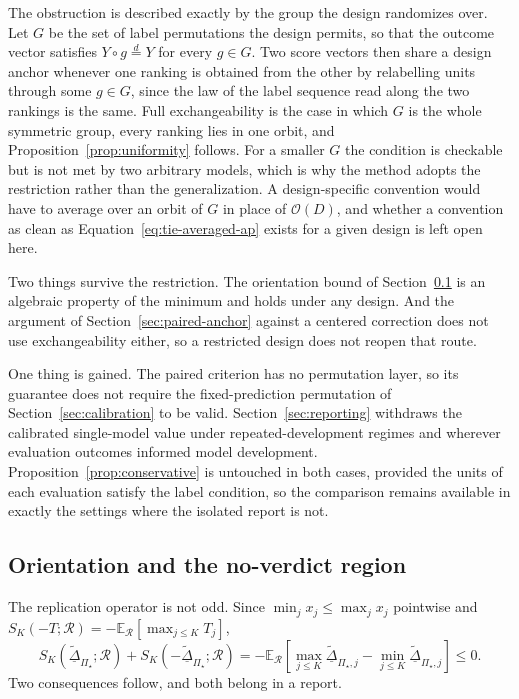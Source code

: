 \documentclass[11pt]{article}
\newcommand{\Regime}{\mathcal{R}}
\newcommand{\PSet}{\Pi_\star}
\newcommand{\E}{\mathbb{E}}
\newcommand{\RobDta}{\underline{\widetilde{\Delta}}_{\PSet}}
\theoremstyle{remark}
\begin{document}
The obstruction is described exactly by the group the design randomizes over. Let $G$ be the set of label permutations the design permits, so that the outcome vector satisfies $Y\circ g\overset{d}{=}Y$ for every $g\in G$. Two score vectors then share a design anchor whenever one ranking is obtained from the other by relabelling units through some $g\in G$, since the law of the label sequence read along the two rankings is the same. Full exchangeability is the case in which $G$ is the whole symmetric group, every ranking lies in one orbit, and Proposition~\ref{prop:uniformity} follows. For a smaller $G$ the condition is checkable but is not met by two arbitrary models, which is why the method adopts the restriction rather than the generalization. A design-specific convention would have to average over an orbit of $G$ in place of $\mathcal{O}(D)$, and whether a convention as clean as Equation~\eqref{eq:tie-averaged-ap} exists for a given design is left open here.

Two things survive the restriction. The orientation bound of Section~\ref{sec:orientation} is an algebraic property of the minimum and holds under any design. And the argument of Section~\ref{sec:paired-anchor} against a centered correction does not use exchangeability either, so a restricted design does not reopen that route.

One thing is gained. The paired criterion has no permutation layer, so its guarantee does not require the fixed-prediction permutation of Section~\ref{sec:calibration} to be valid. Section~\ref{sec:reporting} withdraws the calibrated single-model value under repeated-development regimes and wherever evaluation outcomes informed model development. Proposition~\ref{prop:conservative} is untouched in both cases, provided the units of each evaluation satisfy the label condition, so the comparison remains available in exactly the settings where the isolated report is not.

\subsection{Orientation and the no-verdict region}
\label{sec:orientation}

The replication operator is not odd. Since $\min_j x_j\leq\max_j x_j$ pointwise and $S_K(-T;\Regime)=-\E_{\Regime}[\max_{j\leq K}T_j]$,
\begin{equation}
S_K(\RobDta;\Regime)
+
S_K(-\RobDta;\Regime)
=
-\E_{\Regime}
\left[
\max_{j\leq K}\underline{\widetilde{\Delta}}_{\PSet,j}-\min_{j\leq K}\underline{\widetilde{\Delta}}_{\PSet,j}
\right]
\leq
0 .
\label{eq:orientation}
\end{equation}
Two consequences follow, and both belong in a report.
\end{document}
